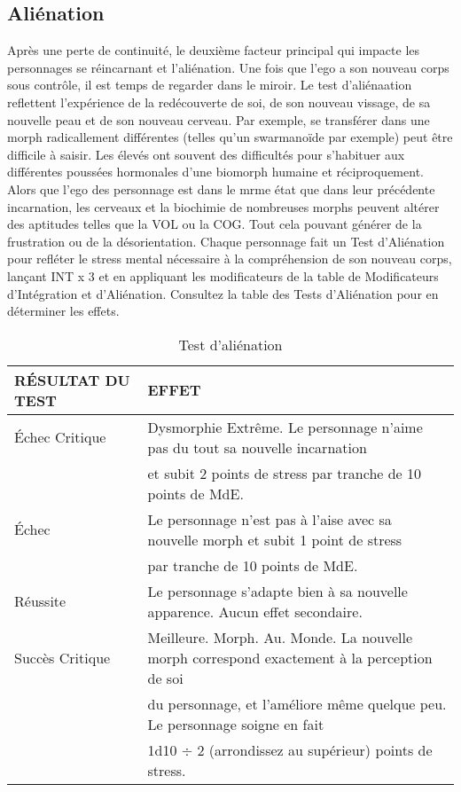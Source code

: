 \subsection{Aliénation} 

Après une perte de continuité, le deuxième facteur principal qui impacte les personnages se réincarnant et l'aliénation. Une fois que l'ego a son nouveau corps sous contrôle, il est temps de regarder dans le miroir. Le test d'aliénaation reflettent l'expérience de la redécouverte de soi, de son nouveau vissage, de sa nouvelle peau et de son nouveau cerveau. Par exemple, se transférer dans une morph radicallement différentes (telles qu'un swarmanoïde par exemple) peut être difficile à saisir. Les élevés ont souvent des difficultés pour s'habituer aux différentes poussées hormonales d'une biomorph humaine et réciproquement. Alors que l'ego des personnage est dans le mrme état que dans leur précédente incarnation, les cerveaux et la biochimie de nombreuses morphs peuvent altérer des aptitudes telles que la VOL ou la COG. Tout cela pouvant générer de la frustration ou de la désorientation. Chaque personnage fait un Test d'Aliénation pour refléter le stress mental nécessaire à la compréhension de son nouveau corps, lançant INT x 3 et en appliquant les modificateurs de la table de Modificateurs d'Intégration et d'Aliénation. Consultez la table des Tests d'Aliénation pour en déterminer les effets. \\ 

\begin{table} \caption{Test d'aliénation} \begin{tabular}{|l|l|} 

\hline

RÉSULTAT DU TEST &EFFET\\ \hline

Échec Critique &Dysmorphie Extrême. Le personnage n'aime pas du tout sa nouvelle incarnation \\ &et subit 2 points de stress par tranche de 10 points de MdE. \\ \hline

Échec &Le personnage n'est pas à l'aise avec sa nouvelle morph et subit 1 point de stress \\ &par tranche de 10 points de MdE. \\ \hline

Réussite &Le personnage s'adapte bien à sa nouvelle apparence. Aucun effet secondaire. \\ \hline

Succès Critique &Meilleure. Morph. Au. Monde. La nouvelle morph correspond exactement à la perception de soi \\ &du personnage, et l'améliore même quelque peu. Le personnage soigne en fait \\ &1d10 $\div$ 2 (arrondissez au supérieur) points de stress. \\ \hline

\end{tabular} \end{table} 

